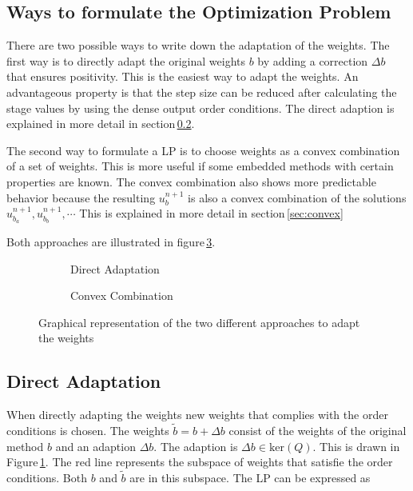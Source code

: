 \documentclass[a4paper]{scrartcl}
\numberwithin{equation}{section}
\theoremstyle{plain}
\theoremstyle{definition}
\numberwithin{theorem}{section}
\newcommand{\1}{\mathbbm{1}}
\begin{document}
\subsection{Ways to formulate the Optimization Problem}

There are two possible ways to write down the adaptation of the weights. The first way is to directly adapt the original weights $b$ by adding a correction $\Delta b$ that ensures positivity.
This is the easiest way to adapt the weights. An advantageous property is that the step size can be reduced after calculating the stage values by using the dense output order conditions.  
The direct adaption is explained in more detail in section\,\ref{sec:direct}.

The second way to formulate a LP is to choose weights as a convex combination of a set of weights. This is more useful if some embedded methods with certain properties are known. 
The convex combination also shows more predictable behavior because the resulting $u^{n+1}_b$ is also a convex combination of the solutions $u^{n+1}_{b_a},u^{n+1}_{b_b},\cdots$ 
This is explained in more detail in section\,\ref{sec:convex}

Both approaches are illustrated in figure\,\ref{fig:b_space}.


\begin{figure}
    \centering
    \begin{subfigure}[b]{0.45\textwidth}
        
        \caption{Direct Adaptation}
        \label{fig:b_direct}
    \end{subfigure}
    \begin{subfigure}[b]{0.45\textwidth}
        
        \caption{Convex Combination}
        \label{fig:b_convex}
    \end{subfigure}
    \caption{Graphical representation of the two different approaches to adapt the weights}\label{fig:b_space}
\end{figure}

\subsection{Direct Adaptation}\label{sec:direct}

When directly adapting the weights new weights that complies with the order conditions is chosen.   
The weights $\tilde{b} = b + \Delta b$ consist of the weights of the original method $b$ and an adaption $\Delta b$. The adaption is $\Delta b \in \mathrm{ker}(Q)$. 
This is drawn in Figure\,\ref{fig:b_direct}. The red line represents the subspace of weights that satisfie the order conditions. Both $b$ and $\tilde{b}$ are in this subspace. 
The LP can be expressed as
\end{document}
